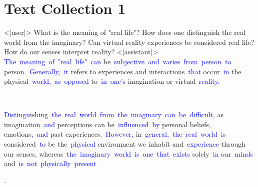\documentclass{article}
\begin{document}
    \section*{Text Collection 1}


\begin{tcolorbox}[colframe=black,colback=white]
<|user|>
What is the meaning of "real life"? How does one distinguish the real world from the imaginary? Can virtual reality experiences be considered real life? How do our senses interpret reality?
<|assistant|>
\textcolor{blue}{The}\textcolor{blue}{~meaning}\textcolor{blue}{~of}\textcolor{blue}{~"}\textcolor{blue}{real}\textcolor{blue}{~life}\textcolor{blue}{"}\textcolor{blue}{~can} be\textcolor{blue}{~subjective}\textcolor{blue}{~and}\textcolor{blue}{~varies}\textcolor{blue}{~from}\textcolor{blue}{~person}\textcolor{blue}{~to} person\textcolor{blue}{.}\textcolor{blue}{~Generally}\textcolor{blue}{,}\textcolor{blue}{~it} refers to experiences and interactions\textcolor{blue}{~that} occur\textcolor{blue}{~in} the physical\textcolor{blue}{~world}\textcolor{blue}{,}\textcolor{blue}{~as}\textcolor{blue}{~opposed} to\textcolor{blue}{~in}\textcolor{blue}{~one}\textcolor{blue}{'s} imagination or virtual\textcolor{blue}{~reality}\textcolor{blue}{.}\textcolor{blue}{~

}\textcolor{blue}{D}\textcolor{blue}{istingu}ishing\textcolor{blue}{~the}\textcolor{blue}{~real}\textcolor{blue}{~world}\textcolor{blue}{~from}\textcolor{blue}{~the}\textcolor{blue}{~imaginary}\textcolor{blue}{~can}\textcolor{blue}{~be}\textcolor{blue}{~difficult}\textcolor{blue}{,} as imagination\textcolor{blue}{~and} perceptions can be\textcolor{blue}{~influenced}\textcolor{blue}{~by} personal beliefs\textcolor{blue}{,} emotions\textcolor{blue}{,}\textcolor{blue}{~and} past experiences\textcolor{blue}{.}\textcolor{blue}{~However}\textcolor{blue}{,} in\textcolor{blue}{~general}\textcolor{blue}{,}\textcolor{blue}{~the}\textcolor{blue}{~real}\textcolor{blue}{~world}\textcolor{blue}{~is} considered\textcolor{blue}{~to} be the\textcolor{blue}{~physical} environment we inhabit and\textcolor{blue}{~experience} through our senses, whereas\textcolor{blue}{~the}\textcolor{blue}{~imaginary}\textcolor{blue}{~world}\textcolor{blue}{~is}\textcolor{blue}{~one}\textcolor{blue}{~that}\textcolor{blue}{~exists} solely\textcolor{blue}{~in} our\textcolor{blue}{~minds} and\textcolor{blue}{~is}\textcolor{blue}{~not}\textcolor{blue}{~physically}\textcolor{blue}{~present}\textcolor{blue}{.

}
\end{tcolorbox}
\end{document}
